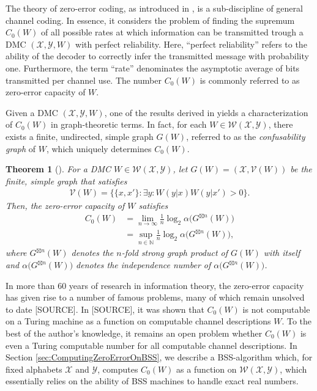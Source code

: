 \documentclass[conference]{IEEEtran}
\def\X{{\mathcal X}}
\def\Y{{\mathcal Y}}
\def\V{{\mathcal V}}
\def\W{{\mathcal W}}
\def\NN{{\mathbb N}}
\newcommand{\sdummy}{{\color{red}[SOURCE]}}
\newtheorem{Theorem}{Theorem}
\begin{document}
	The theory of zero-error coding, as introduced in \cite{Sh56}, is a sub-discipline of general channel coding. In essence, it considers the problem of finding the supremum 
	\(C_0(W)\) of all possible rates at which information can be transmitted trough a DMC \((\X,\Y,W)\) with perfect reliability. Here, ``perfect reliability'' refers
	to the ability of the decoder to correctly infer the transmitted message with probability one. Furthermore, the term ``rate'' denominates the asymptotic average of bits transmitted per channel use. 
	The number \(C_0(W)\) is commonly referred to as zero-error capacity of \(W\).

	Given a DMC \((\X,\Y,W)\), one of the results derived in \cite{Sh56} yields a characterization of \(C_0(W)\) in graph-theoretic terms.
	In fact, for each \(W\in \W(\X,\Y)\), there exists a finite, undirected, simple graph \(G(W)\), referred to as the \emph{confusability graph} of \(W\), which
	uniquely determines \(C_0(W)\).

	\begin{Theorem}	[\cite{Sh56}]\label{thm:ZE_Capacity}
					For a DMC \(W\in\W(\X,\Y)\), let \(G(W) = (\X, \V(W))\) be the finite, simple graph that satisfies
					\begin{align*}   \V(W) = \big\{\{x,x'\} : \exists y : W(y|x)W(y|x') > 0\big\}.
					\end{align*}
					Then, the zero-error capacity of \(W\) satisfies
					\begin{align*}   C_0(W)  	&=  \lim_{n\to\infty} \frac{1}{n} \log_2 \alpha\big(G^{\boxtimes n }(W)\big) \\
												&=  \sup_{n\in\NN} \frac{1}{n} \log_2 \alpha\big(G^{\boxtimes n }(W)\big),
					\end{align*}
					where \(G^{\boxtimes n }(W)\) denotes the \(n\)-fold \emph{strong graph product} of \(G(W)\) with itself and
					\(\alpha\big(G^{\boxtimes n }(W)\big)\) denotes the \emph{independence number} of \(\alpha\big(G^{\boxtimes n }(W)\big)\).
	\end{Theorem}
	
	In more than 60 years of research in information theory, the zero-error capacity has given rise to a number of famous problems, many of which remain
	unsolved to date \sdummy. In \sdummy, it was shown that \(C_0(W)\) is not computable on a Turing machine as a function on computable channel descriptions \(W\).
	To the best of the author's knowledge, it remains an open problem whether \(C_0(W)\) is even a Turing computable number for all computable channel descriptions.
	In Section \ref{sec:ComputingZeroErrorOnBSS}, we describe a BSS-algorithm which, for fixed alphabets \(\X\) and \(\Y\), computes \(C_0(W)\) as a function on \(\W(\X,\Y)\), which
	essentially relies on the ability of BSS machines to handle exact real numbers.
\end{document}
